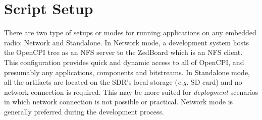 \section{Script Setup}
There are two type of setups or modes for running applications on any embedded radio: Network and Standalone. In Network mode, a development system hosts the OpenCPI tree as an NFS server to the ZedBoard which is an NFS client. This configuration provides quick and dynamic access to all of OpenCPI, and presumably any applications, components and bitstreams. In Standalone mode, all the artifacts are located on the SDR's local storage (\textit{e.g.} SD card) and no network connection is required. This may be more suited for \textit{deployment} scenarios in which network connection is not possible or practical. Network mode is generally preferred during the development process.


